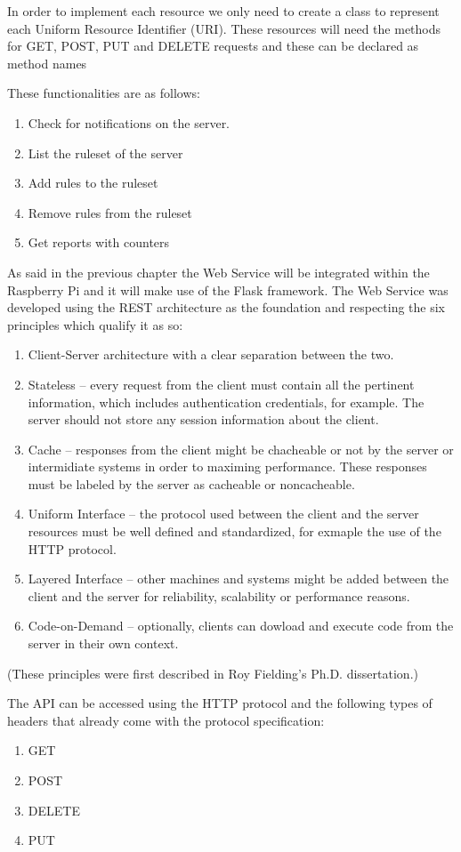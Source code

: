 In order to implement each resource we only need to create a class to represent
each Uniform Resource Identifier (URI). These resources will need the methods
for GET, POST, PUT and DELETE requests and these can be declared as method names

These functionalities are as follows:
\begin{enumerate}
	\item Check for notifications on the server.
	\item List the ruleset of the server
	\item Add rules to the ruleset
	\item Remove rules from the ruleset
	\item Get reports with counters
\end{enumerate}

As said in the previous chapter the Web Service will be integrated within the
Raspberry Pi and it will make use of the Flask framework. The Web Service was
developed using the REST architecture as the foundation and respecting the six
principles which qualify it as so:
\begin{enumerate}
	\item Client-Server architecture with a clear separation between the two.
	\item Stateless -- every request from the client must contain all the
		pertinent information, which includes authentication credentials, for
		example. The server should not store any session information about the
		client.
	\item Cache -- responses from the client might be chacheable or not by the
		server or intermidiate systems in order to maximing performance. These
		responses must be labeled by the server as cacheable or noncacheable.
	\item Uniform Interface -- the protocol used between the client and the
		server resources must be well defined and standardized, for exmaple the
		use of the HTTP protocol.
	\item Layered Interface -- other machines and systems might be added between
		the client and the server for reliability, scalability or performance
		reasons.
	\item Code-on-Demand -- optionally, clients can dowload and execute code
		from the server in their own context.
\end{enumerate}
(These principles were first described in Roy Fielding's Ph.D. dissertation.)

The API can be accessed using the HTTP protocol and the following types of
headers that already come with the protocol specification:
\begin{enumerate}
	\item GET
	\item POST
	\item DELETE
	\item PUT
\end{enumerate}

